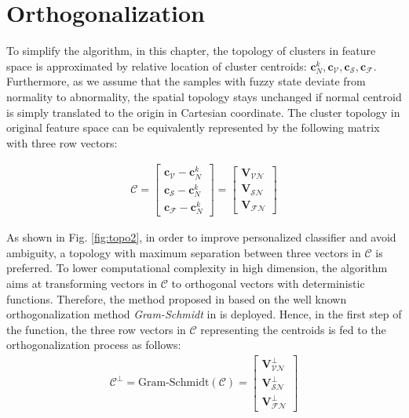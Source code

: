  
\section{Orthogonalization}

To simplify the algorithm, in this chapter, the topology of clusters in feature space is approximated by relative location of cluster centroids: $\mathbf{c}_N^k, \mathbf{c}_{\mathcal{V}}, \mathbf{c}_{\mathcal{S}}, \mathbf{c}_{\mathcal{F}}$. Furthermore, as we assume that the samples with fuzzy state deviate from normality to abnormality, the spatial topology stays unchanged if normal centroid is simply translated to the origin in Cartesian coordinate. The cluster topology in original feature space can be equivalently represented by the following matrix with three row vectors:

\begin{align}
\mathcal{C} = 
\begin{bmatrix}
\mathbf{c}_{\mathcal{V}} - \mathbf{c}_N^k \\
\mathbf{c}_{\mathcal{S}} - \mathbf{c}_N^k \\
\mathbf{c}_{\mathcal{F}} - \mathbf{c}_N^k
\end{bmatrix} = 
\begin{bmatrix}
\mathbf{V}_{\mathcal{VN}} \\
\mathbf{V}_{\mathcal{SN}} \\
\mathbf{V}_{\mathcal{FN}}
\end{bmatrix}
\end{align}

As shown in Fig. \ref{fig:topo2}, in order to improve personalized classifier and avoid ambiguity, a topology with maximum separation between three vectors in $\mathcal{C}$ is preferred. To lower computational complexity in high dimension, the algorithm aims at transforming vectors in $\mathcal{C}$ to orthogonal vectors with deterministic functions. Therefore, the method proposed in \cite{Gram-schmidth2} based on the well known orthogonalization method \textit{Gram-Schmidt} in \cite{Gram-schmidth1} is deployed. Hence, in the first step of the function, the three row vectors in $\mathcal{C}$ representing the centroids is fed to the orthogonalization process as follows:
\begin{align}
\mathcal{C}^{\perp}= \text{Gram-Schmidt}(\mathcal{C})
=
\begin{bmatrix}
\mathbf{V}_{\mathcal{VN}}^{\perp} \\
\mathbf{V}_{\mathcal{SN}}^{\perp} \\
\mathbf{V}_{\mathcal{FN}}^{\perp}
\end{bmatrix}
\end{align}

